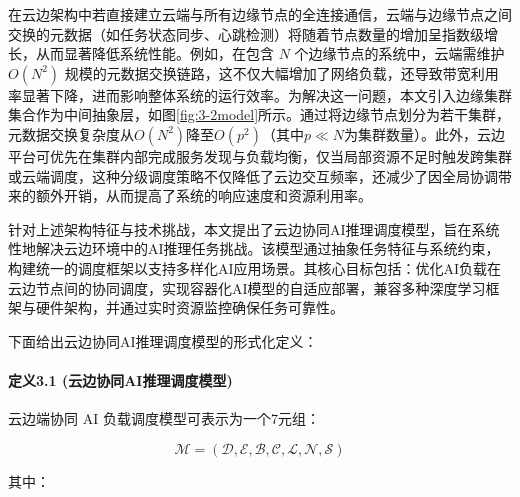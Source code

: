 在云边架构中若直接建立云端与所有边缘节点的全连接通信，云端与边缘节点之间交换的元数据（如任务状态同步、心跳检测）将随着节点数量的增加呈指数级增长，从而显著降低系统性能。例如，在包含 $N$ 个边缘节点的系统中，云端需维护 $O(N^2)$ 规模的元数据交换链路，这不仅大幅增加了网络负载，还导致带宽利用率显著下降，进而影响整体系统的运行效率。为解决这一问题，本文引入边缘集群集合作为中间抽象层，如图\ref{fig:3-2model}所示。通过将边缘节点划分为若干集群，元数据交换复杂度从$O(N^2)$降至$O(p^2)$（其中$p \ll N$为集群数量）。此外，云边平台可优先在集群内部完成服务发现与负载均衡，仅当局部资源不足时触发跨集群或云端调度，这种分级调度策略不仅降低了云边交互频率，还减少了因全局协调带来的额外开销，从而提高了系统的响应速度和资源利用率。

针对上述架构特征与技术挑战，本文提出了云边协同AI推理调度模型，旨在系统性地解决云边环境中的AI推理任务挑战。该模型通过抽象任务特征与系统约束，构建统一的调度框架以支持多样化AI应用场景。其核心目标包括：优化AI负载在云边节点间的协同调度，实现容器化AI模型的自适应部署，兼容多种深度学习框架与硬件架构，并通过实时资源监控确保任务可靠性。

下面给出云边协同AI推理调度模型的形式化定义：

\paragraph{定义3.1 (云边协同AI推理调度模型)}云边端协同 AI 负载调度模型可表示为一个7元组：

\[
\mathcal{M} = (\mathcal{D}, \mathcal{E}, \mathcal{B}, \mathcal{C}, \mathcal{L}, \mathcal{N}, \mathcal{S})
\]

其中：

